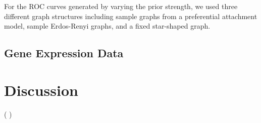 \documentclass{uwstat572}
\newcommand{\vmcomment}[1]{({\color{blue}{VM's comment:}} \textbf{\color{blue}{#1}})}
\theoremstyle{remark}
\theoremstyle{definition}
\begin{document}
For the ROC curves generated by varying the prior strength, we used three different graph structures including sample graphs from a preferential attachment model, sample Erdos-Renyi graphs, and a fixed star-shaped graph. 



\subsection{Gene Expression Data}

\section{Discussion}


\vmcomment{Some reference clean up is in order: protect capitalization in Gaussian, etc. and get rid of dois and urls}


\end{document}
